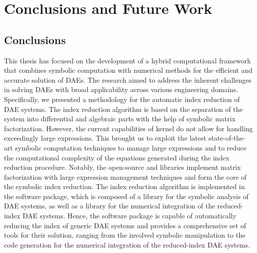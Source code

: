 
\chapter{Conclusions and Future Work}
\label{chap6:conclusions}

\section{Conclusions}

This thesis has focused on the development of a hybrid computational framework that combines symbolic computation with numerical methods for the efficient and accurate solution of \acp{DAE}. The research aimed to address the inherent challenges in solving \acp{DAE} with broad applicability across various engineering domains. Specifically, we presented a methodology for the automatic index reduction of \ac{DAE} systems. The index reduction algorithm is based on the separation of the system into differential and algebraic parts with the help of symbolic matrix factorization. However, the current capabilities of \Maple{} kernel do not allow for handling exceedingly large expressions. This brought us to exploit the latest state-of-the-art symbolic computation techniques to manage large expressions and to reduce the computational complexity of the equations generated during the index reduction procedure. Notably, the open-source \LEM{} and \LAST{} libraries implement matrix factorization with large expression management techniques and form the core of the symbolic index reduction. The index reduction algorithm is implemented in the \Indigo{} software package, which is composed of a \Maple{} library for the symbolic analysis of \ac{DAE} systems, as well as a \Matlab{} library for the numerical integration of the reduced-index \ac{DAE} systems. Hence, the \Indigo{} software package is capable of automatically reducing the index of generic \ac{DAE} systems and provides a comprehensive set of tools for their solution, ranging from the involved symbolic manipulation to the \Matlab{} code generation for the numerical integration of the reduced-index \ac{DAE} systems.

